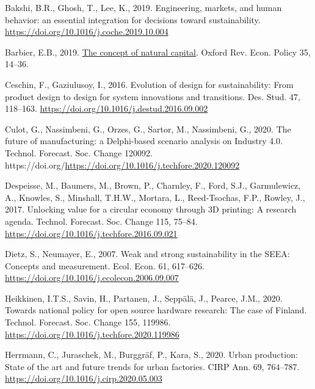 \documentclass[
  11pt,
]{article}
\newlength{\cslhangindent}
\newlength{\cslentryspacingunit} %
\newenvironment{CSLReferences}[2] %
 {%
  \setlength{\parindent}{0pt}
  \ifodd #1
  \let\oldpar\par
  \def\par{\hangindent=\cslhangindent\oldpar}
  \fi
  \setlength{\parskip}{#2\cslentryspacingunit}
 }%
 {}
\begin{document}
\hypertarget{refs}{}
\begin{CSLReferences}{1}{0}
\leavevmode{}%
Bakshi, B.R., Ghosh, T., Lee, K., 2019. {Engineering, markets, and human
behavior: an essential integration for decisions toward sustainability}.
\url{https://doi.org/10.1016/j.coche.2019.10.004}

\leavevmode{}%
Barbier, E.B., 2019.
\href{https://academic.oup.com/oxrep/article/35/1/14/5267896}{{The
concept of natural capital}}. Oxford Rev. Econ. Policy 35, 14--36.

\leavevmode{}%
Ceschin, F., Gaziulusoy, I., 2016. {Evolution of design for
sustainability: From product design to design for system innovations and
transitions}. Des. Stud. 47, 118--163.
\url{https://doi.org/10.1016/j.destud.2016.09.002}

\leavevmode{}%
Culot, G., Nassimbeni, G., Orzes, G., Sartor, M., Nassimbeni, G., 2020.
{The future of manufacturing: a Delphi-based scenario analysis on
Industry 4.0}. Technol. Forecast. Soc. Change 120092.
https://doi.org/\url{https://doi.org/10.1016/j.techfore.2020.120092}

\leavevmode{}%
Despeisse, M., Baumers, M., Brown, P., Charnley, F., Ford, S.J.,
Garmulewicz, A., Knowles, S., Minshall, T.H.W., Mortara, L.,
Reed-Tsochas, F.P., Rowley, J., 2017. {Unlocking value for a circular
economy through 3D printing: A research agenda}. Technol. Forecast. Soc.
Change 115, 75--84. \url{https://doi.org/10.1016/j.techfore.2016.09.021}

\leavevmode{}%
Dietz, S., Neumayer, E., 2007. {Weak and strong sustainability in the
SEEA: Concepts and measurement}. Ecol. Econ. 61, 617--626.
\url{https://doi.org/10.1016/j.ecolecon.2006.09.007}

\leavevmode{}%
Heikkinen, I.T.S., Savin, H., Partanen, J., Seppälä, J., Pearce, J.M.,
2020. {Towards national policy for open source hardware research: The
case of Finland}. Technol. Forecast. Soc. Change 155, 119986.
\url{https://doi.org/10.1016/j.techfore.2020.119986}

\leavevmode{}%
Herrmann, C., Juraschek, M., Burggräf, P., Kara, S., 2020. {Urban
production: State of the art and future trends for urban factories}.
CIRP Ann. 69, 764--787. \url{https://doi.org/10.1016/j.cirp.2020.05.003}


\end{CSLReferences}
\end{document}
